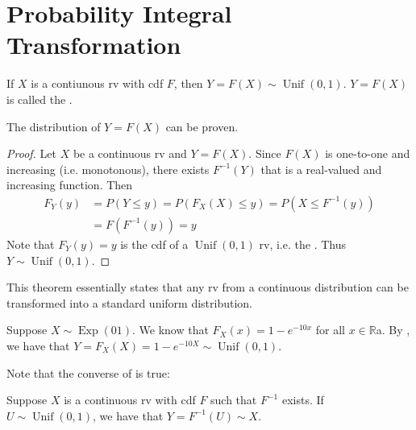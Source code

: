 \documentclass[notoc,notitlepage]{tufte-book}
\DeclareMathOperator{\Exp}{Exp }
\DeclareMathOperator{\Unif}{Unif }
\begin{document}
\section{Probability Integral Transformation}%
\label{sec:probability_integral_transformation}


\begin{thm}
\label{thm:probability_integral_transformation}
  If $X$ is a contiunous rv with cdf $F$, then $Y = F(X) \sim \Unif(0, 1)$. $Y = F(X)$ is called the .
\end{thm}

\begin{note}
  The distribution of $Y = F(X)$ can be proven.
\end{note}

\begin{proof}
  Let $X$ be a continuous rv and $Y = F(X)$. Since $F(X)$ is one-to-one and increasing (i.e. monotonous), there exists $F^{-1}(Y)$ that is a real-valued and increasing function. Then
  \begin{align*}
    F_Y(y) &= P(Y \leq y) = P( F_X(X) \leq y ) = P(X \leq F^{-1}(y) ) \\
           &= F( F^{-1}(y) ) = y
  \end{align*}
  Note that $F_Y(y) = y$ is the cdf of a $\Unif(0, 1)$ rv, i.e. the . Thus $Y \sim \Unif(0, 1)$.
\end{proof}

\begin{note}
  This theorem essentially states that any rv from a continuous distribution can be transformed into a standard uniform distribution.
\end{note}

\begin{eg}[Example 2.11]
  Suppose $X \sim \Exp(0 1)$. We know that $F_X(x) = 1 - e^{-10x}$ for all $x \in \mathbb{R}$a. By , we have that $Y = F_X(X) = 1 - e^{-10X} \sim \Unif(0, 1)$.
\end{eg}

  Note that the converse of  is true:

\begin{thm}
\label{thm:converse_of_probability_integral_transformation}
  Suppose $X$ is a continuous rv with cdf $F$ such that $F^{-1}$ exists. If $U \sim \Unif(0, 1)$, we have that $Y = F^{-1}(U) \sim X$.
\end{thm}
\end{document}
